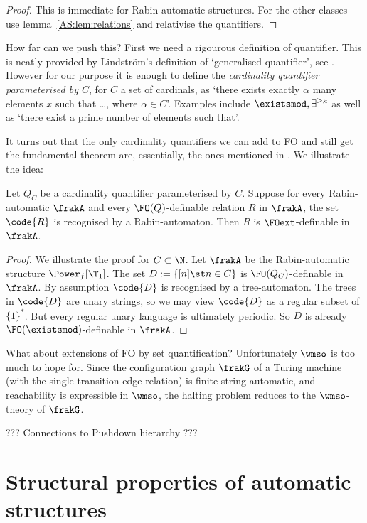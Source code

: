 \begin{proof}
This is immediate for Rabin-automatic structures. For the other classes use lemma~\ref{AS:lem:relations} and relativise
the quantifiers.
\end{proof}
 
How far can we push this? First we need a rigourous definition of quantifier.
This is neatly provided by Lindstr\"om's definition of `generalised quantifier',
see \cite{}. However for our purpose it is enough to define the
{\em cardinality quantifier parameterised by $C$}, for $C$  a set of
cardinals, as `there exists exactly $\alpha$ many elements $x$ such that \ldots,
where $\alpha \in C$'. Examples include $\existsmod,\exists^{\geq \kappa}$ as well as
`there exist a prime number of elements such that'.

It turns out that the only cardinality quantifiers we can add to FO and still get the fundamental theorem are, essentially, 
the ones mentioned in \cite{AS:thm:FOext}. We illustrate the idea:

\begin{theorem}
Let $Q_C$ be a cardinality quantifier parameterised by $C$.  Suppose for every
Rabin-automatic $\frakA$ and every $\FO(Q)$-definable relation $R$ in $\frakA$,
the set $\code{R}$ is recognised by a Rabin-automaton.  Then $R$ is
$\FOext$-definable in $\frakA$. 
\end{theorem}

\begin{proof}
We illustrate the proof for $C \subset \N$. Let $\frakA$ be the Rabin-automatic structure $\Power_f[\T_1]$.
The set $D: = \{[n] \st n \in C\}$ is $\FO(Q_C)$-definable in $\frakA$. 
By assumption $\code{D}$ is recognised by a tree-automaton. The trees in $\code{D}$ are unary strings,
so we may view $\code{D}$ as a regular subset of $\{1\}^\ast$. But every regular unary language is ultimately periodic.
So $D$ is already $\FO(\existsmod)$-definable in $\frakA$.
\end{proof}

What about extensions of FO by set quantification?  Unfortunately $\wmso$ is
too much to hope for.  Since the configuration graph $\frakG$ of a Turing machine (with the
single-transition edge relation) is finite-string automatic, and reachability
is expressible in $\wmso$, the halting problem reduces to the $\wmso$-theory of $\frakG$.

??? Connections to Pushdown hierarchy ???
\section{Structural properties of automatic structures}

